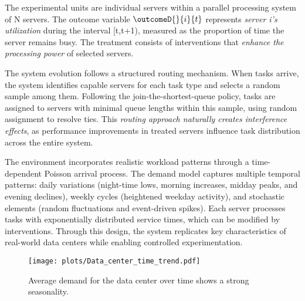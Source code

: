 The experimental units are individual servers within a parallel processing system of N servers. The outcome variable $\outcomeD{}{i}{t}$ represents \emph{server i's utilization} during the interval [t,t+1), measured as the proportion of time the server remains busy. The treatment consists of interventions that \emph{enhance the processing power} of selected servers.

The system evolution follows a structured routing mechanism. When tasks arrive, the system identifies capable servers for each task type and selects a random sample among them. Following the join-the-shortest-queue policy, tasks are assigned to servers with minimal queue lengths within this sample, using random assignment to resolve ties. This \emph{routing approach naturally creates interference effects}, as performance improvements in treated servers influence task distribution across the entire system.

The environment incorporates realistic workload patterns through a time-dependent Poisson arrival process. The demand model captures multiple temporal patterns: daily variations (night-time lows, morning increases, midday peaks, and evening declines), weekly cycles (heightened weekday activity), and stochastic elements (random fluctuations and event-driven spikes). Each server processes tasks with exponentially distributed service times, which can be modified by interventions. Through this design, the system replicates key characteristics of real-world data centers while enabling controlled experimentation.
% 
\begin{figure}
    \centering
    \texttt{[image: plots/Data\_center\_time\_trend.pdf]}
    \caption{Average demand for the data center over time shows a strong seasonality.}
    \label{fig:Data_center_time_trend}
\end{figure}
%